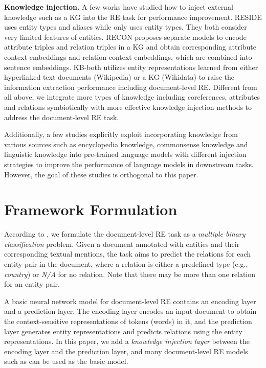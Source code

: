 \documentclass[runningheads]{llncs}
\begin{document}
\textbf{Knowledge injection.} A few works have studied how to inject external knowledge such as a KG into the RE task for performance improvement.
RESIDE \cite{vashishth2018reside} uses entity types and aliases while  \cite{fernandez2020enhancing} only uses entity types.
They both consider very limited features of entities.
RECON \cite{bastos2021recon} proposes separate models to encode attribute triples and relation triples in a KG and obtain corresponding attribute context embeddings and relation context embeddings, which are combined into sentence embeddings. 
KB-both \cite{verlinden2021injecting} utilizes entity representations learned from either hyperlinked text documents (Wikipedia) or a KG (Wikidata) to raise the information extraction performance including document-level RE. 
Different from all above, we integrate more types of knowledge including coreferences, attributes and relations symbiotically with more effective knowledge injection methods to address the document-level RE task.

Additionally, a few studies \cite{liu2020kbert,wei2021knowledge,zhang2019ernie} explicitly exploit incorporating knowledge from various sources such as encyclopedia knowledge, commonsense knowledge and linguistic
knowledge into pre-trained language models with different injection strategies to improve the performance of language models in downstream tasks.
However, the goal of these studies is orthogonal to this paper.


\section{Framework Formulation}
\label{sect:problem}

According to \cite{tang2020hin,yao2019docred,zhou2021document}, we formulate the document-level RE task as a \emph{multiple binary classification} problem.
Given a document annotated with entities and their corresponding textual mentions, the task aims to predict the relations for each entity pair in the document, where a relation is either a predefined type (e.g., \textit{country}) or \textit{N/A} for no relation.
Note that there may be more than one relation for an entity pair.

A basic neural network model \cite{yao2019docred} for document-level RE contains an encoding layer and a prediction layer.
The encoding layer encodes an input document to obtain the context-sensitive representations of tokens (words) in it, and the prediction layer generates entity representations and predicts relations using the entity representations.
In this paper, we add a \emph{knowledge injection layer} between the encoding layer and the prediction layer, and many document-level RE models such as \cite{wang2020global,yao2019docred,zhou2021document} can be used as the basic model. 
\end{document}
